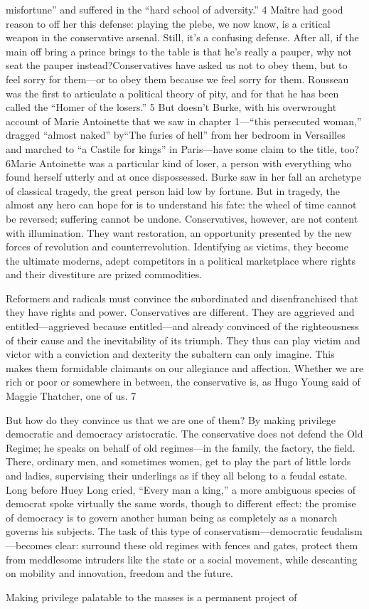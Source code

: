 misfortune” and suffered in the “hard school of adversity.” {\color{blue} 4 } Maître had good reason to off her this defense: playing the plebe, we now know, is a critical weapon in the conservative arsenal. Still, it’s a confusing defense. After all, if the main off bring a prince brings to the table is that he’s really a pauper, why not seat the pauper instead?Conservatives have asked us not to obey them, but to feel sorry for them—or to obey them because we feel sorry for them. Rousseau was the first to articulate a political theory of pity, and for that he has been called the “Homer of the losers.” {\color{blue} 5 } But doesn’t Burke, with his overwrought account of Marie Antoinette that we saw in chapter 1—“this persecuted woman,” dragged “almost naked” by“The furies of hell” from her bedroom in Versailles and marched to “a Castile for kings” in Paris—have some claim to the title, too? 6Marie Antoinette was a particular kind of loser, a person with everything who found herself utterly and at once dispossessed. Burke saw in her fall an archetype of classical tragedy, the great person laid low by fortune. But in tragedy, the almost any hero can hope for is to understand his fate: the wheel of time cannot be reversed; suffering cannot be undone. Conservatives, however, are not content with illumination. They want restoration, an opportunity presented by the new forces of revolution and counterrevolution. Identifying as victims, they become the ultimate moderns, adept competitors in a political marketplace where rights and their divestiture are prized commodities.{\par} Reformers and radicals must convince the subordinated and disenfranchised that they have rights and power. Conservatives are different. They are aggrieved and entitled—aggrieved because entitled—and already convinced of the righteousness of their cause and the inevitability of its triumph. They thus can play victim and victor with a conviction and dexterity the subaltern can only imagine. This makes them formidable claimants on our allegiance and affection. Whether we are rich or poor or somewhere in between, the conservative is, as Hugo Young said of Maggie Thatcher, one of us. {\color{blue} 7 } {\par} But how do they convince us that we are one of them? By making privilege democratic and democracy aristocratic. The conservative does not defend the Old Regime; he speaks on behalf of old regimes—in the family, the factory, the field. There, ordinary men, and sometimes women, get to play the part of little lords and ladies, supervising their underlings as if they all belong to a feudal estate. Long before Huey Long cried, “Every man a king,” a more ambiguous species of democrat spoke virtually the same words, though to different effect: the promise of democracy is to govern another human being as completely as a monarch governs his subjects. The task of this type of conservatism—democratic feudalism—becomes clear: surround these old regimes with fences and gates, protect them from meddlesome intruders like the state or a social movement, while descanting on mobility and innovation, freedom and the future.{\par} Making privilege palatable to the masses is a permanent project of 
